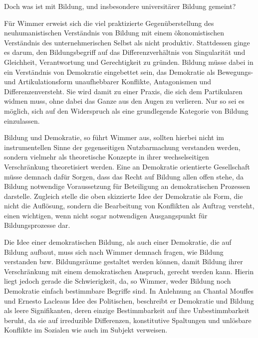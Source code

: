 Doch was ist mit Bildung, und insbesondere universitärer
Bildung gemeint? 

Für Wimmer erweist sich die viel praktizierte Gegenüberstellung des
neuhumanistischen Verständnis von Bildung mit einem ökonomistischen Verständnis
des unternehmerischen Selbst als nicht produktiv. Stattdessen ginge es darum,
\glqq den Bildungsbegriff auf das Differenzverhältnis von Singularität und
Gleichheit, Verantwortung und Gerechtigkeit zu gründen.\grqq\footnotemark
{} Bildung müsse dabei
in ein Verständnis von Demokratie eingebettet sein, das Demokratie als
\glqq Bewegungs- und Artikulationsform unaufhebbarer Konflikte, Antagonismen und
Differenzen\grqq versteht. Sie wird damit zu einer Praxis, die sich dem
Partikularen widmen muss, ohne dabei das Ganze aus den Augen zu verlieren. Nur
so sei es möglich, sich auf den Widerspruch als eine grundlegende Kategorie von
Bildung einzulassen.

Bildung und Demokratie, so führt Wimmer aus, sollten
hierbei nicht im instrumentellen Sinne der gegenseitigen Nutzbarmachung
verstanden werden, sondern vielmehr als theoretische Konzepte in ihrer
wechselseitigen Verschränkung theoretisiert werden. Eine an Demokratie
orientierte Gesellschaft müsse demnach dafür Sorgen, dass das Recht auf Bildung
allen offen stehe, da Bildung notwendige Voraussetzung für Beteiligung an
demokratischen Prozessen darstelle. Zugleich stelle die oben skizzierte Idee
der Demokratie als Form, die nicht die Auflösung, sondern die Bearbeitung von
Konflikten als Auftrag versteht, einen wichtigen, wenn nicht sogar notwendigen
Ausgangspunkt für Bildungsprozesse dar.\footnotemark {} 

Die Idee einer demokratischen Bildung,
als auch einer Demokratie, die auf Bildung aufbaut, muss sich nach Wimmer
demnach fragen, wie Bildung verstanden bzw. Bildungsräume gestaltet werden
können, damit Bildung ihrer Verschränkung mit einem demokratischen Anspruch,
gerecht werden kann. Hierin liegt jedoch gerade die Schwierigkeit, da, so
Wimmer, weder Bildung noch Demokratie einfach bestimmbare Begriffe sind. In
Anlehnung an Chantal Mouffes und Ernesto Lacleaus Idee des Politischen,
beschreibt er Demokratie und Bildung als leere Signifikanten, deren einzige
Bestimmbarkeit auf ihre Unbestimmbarkeit beruht, da sie \glqq auf irreduzible
Differenzen, konstitutive Spaltungen und unlösbare Konflikte im Sozialen wie
auch im Subjekt\grqq\footnotemark {} verweisen. 

